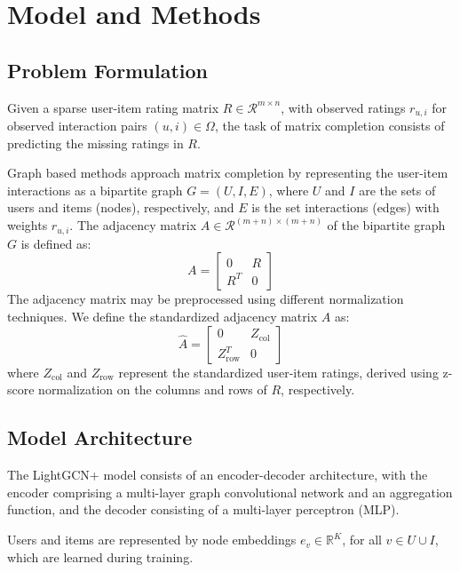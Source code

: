 \documentclass[10pt,conference,compsocconf]{IEEEtran}
\begin{document}
\section{Model and Methods}
\subsection{Problem Formulation}
Given a sparse user-item rating matrix $R \in \mathcal{R}^{m \times n}$, with observed ratings $r_{u,i}$ for observed interaction pairs $(u,i) \in \Omega$, the task of matrix completion consists of predicting the missing ratings in $R$.

Graph based methods approach matrix completion by representing the user-item interactions as a bipartite graph $G = (U, I, E)$, where $U$ and $I$ are the sets of users and items (nodes), respectively, and $E$ is the set interactions (edges) with weights $r_{u,i}$.
The adjacency matrix $A \in \mathcal{R}^{(m+n) \times (m+n)}$ of the bipartite graph $G$ is defined as:
\begin{equation}
    A = \begin{bmatrix}
    0 & R \\
    R^T & 0
    \end{bmatrix}
\end{equation}
The adjacency matrix may be preprocessed using different normalization techniques.
We define the standardized adjacency matrix \(\hat{A}\) as:
\begin{equation}
    \hat{A} = \begin{bmatrix}
    0 & Z_{\text{col}} \\
    Z_{\text{row}}^T & 0
    \end{bmatrix}
    \label{eq:A_hat}
\end{equation}
where \(Z_{\text{col}}\) and \(Z_{\text{row}}\) represent the standardized user-item ratings, derived using z-score normalization on the columns and rows of \(R\), respectively. 

\subsection{Model Architecture}
The LightGCN+ model consists of an encoder-decoder architecture, with the encoder comprising a multi-layer graph convolutional network and an aggregation function, and the decoder consisting of a multi-layer perceptron (MLP).

Users and items are represented by node embeddings $e_v \in \mathbb{R}^K$, for all $v \in U \cup I$, which are learned during training.
\end{document}

